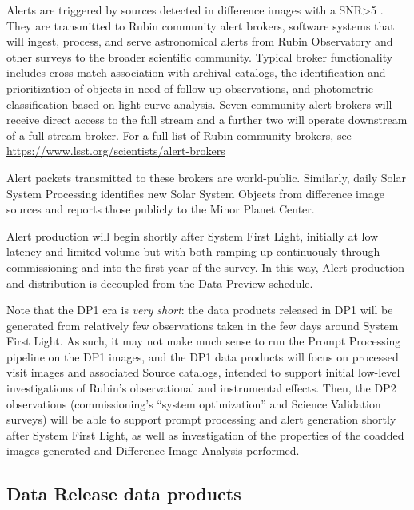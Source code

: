 Alerts are triggered by sources detected in difference images with a SNR>5 .
They are transmitted to Rubin community alert brokers, software systems that will ingest, process, and serve astronomical alerts from Rubin Observatory and other surveys to the broader scientific community.
Typical broker functionality includes cross-match association with archival catalogs, the identification and prioritization of objects in need of follow-up observations, and photometric classification based on light-curve analysis.
Seven community alert brokers will receive direct access to the full stream and a further two will operate downstream of a full-stream broker.
For a full list of Rubin community brokers, see \url{https://www.lsst.org/scientists/alert-brokers}

Alert packets transmitted to these brokers are world-public.
Similarly, daily Solar System Processing identifies new Solar System Objects from difference image sources and reports those publicly to the Minor Planet Center.

Alert production will begin shortly after System First Light, initially at low latency and limited volume but with both ramping up continuously through commissioning and into the first year of the survey.
In this way, Alert production and distribution is decoupled from the Data Preview schedule.

Note that the DP1 era is {\it very short}: the data products released in DP1 will be generated from relatively few observations taken in the few days around System First Light.
As such, it may not make much sense to run the Prompt Processing pipeline on the DP1 images, and the DP1 data products will focus on processed visit images and associated Source catalogs, intended to support initial low-level investigations of Rubin's observational and instrumental effects.
Then, the DP2 observations (commissioning's ``system optimization'' and Science Validation surveys) will be able to support prompt processing and alert generation shortly after System First Light, as well as investigation of the properties of the coadded images generated and Difference Image Analysis performed.

\subsection{Data Release data products}

